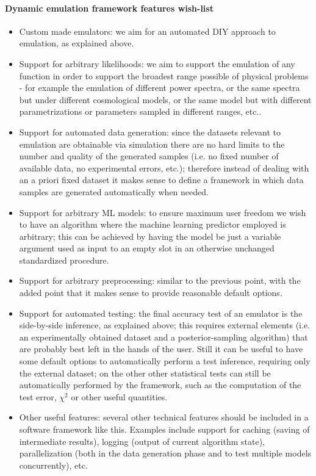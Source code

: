 \paragraph{Dynamic emulation framework features wish-list}
\begin{itemize}
    \item Custom made emulators: we aim for an automated DIY approach to emulation, as explained above.
    \item Support for arbitrary likelihoods: we aim to support the emulation of any function in order to support the broadest range possible of physical problems - for example the emulation of different power spectra, or the same spectra but under different cosmological models, or the same model but with different parametrizations or parameters sampled in different ranges, etc..
    \item Support for automated data generation: since the datasets relevant to emulation are obtainable via simulation there are no hard limits to the number and quality of the generated samples (i.e. no fixed number of available data, no experimental errors, etc.); therefore instead of dealing with an a priori fixed dataset it makes sense to define a framework in which data samples are generated automatically when needed.
    \item Support for arbitrary ML models: to ensure maximum user freedom we wish to have an algorithm where the machine learning predictor employed is arbitrary; this can be achieved by having the model be just a variable argument used as input to an empty slot in an otherwise unchanged standardized procedure.
    \item Support for arbitrary preprocessing: similar to the previous point, with the added point that it makes sense to provide reasonable default options.
    \item Support for automated testing: the final accuracy test of an emulator is the side-by-side inference, as explained above; this requires external elements (i.e. an experimentally obtained dataset and a posterior-sampling algorithm) that are probably best left in the hands of the user. Still it can be useful to have some default options to automatically perform a test inference, requiring only the external dataset; on the other other statistical tests can still be automatically performed by the framework, such as the computation of the test error, $\chi^2$ or other useful quantities.
    \item Other useful features: several other technical features should be included in a software framework like this. Examples include support for caching (saving of intermediate results), logging (output of current algorithm state), parallelization (both in the data generation phase and to test multiple models concurrently), etc.
\end{itemize}


